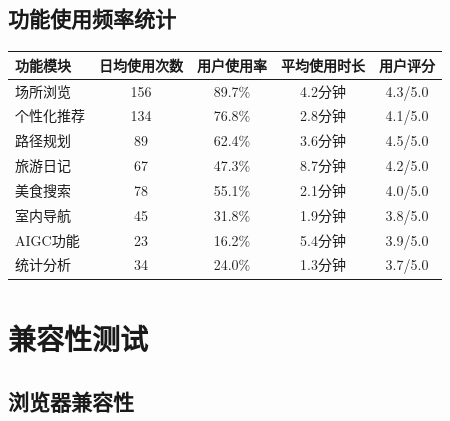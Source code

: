\documentclass[12pt,a4paper]{article}
\begin{document}
\subsection{功能使用频率统计}

\begin{table}[H]
\centering
\begin{tcolorbox}[
    colback=light,
    colframe=primary,
    title={\textbf{功能模块使用情况}},
    coltitle=white,
    colbacktitle=primary,
    fonttitle=\bfseries,
    rounded corners=5pt,
    width=0.95\textwidth
]
\begin{tabular}{lcccc}
\toprule
\rowcolor{primary!20}
\textbf{功能模块} & \textbf{日均使用次数} & \textbf{用户使用率} & \textbf{平均使用时长} & \textbf{用户评分} \\
\midrule
场所浏览 & 156 & 89.7\% & 4.2分钟 & 4.3/5.0 \\
\rowcolor{light}
个性化推荐 & 134 & 76.8\% & 2.8分钟 & 4.1/5.0 \\
路径规划 & 89 & 62.4\% & 3.6分钟 & 4.5/5.0 \\
\rowcolor{light}
旅游日记 & 67 & 47.3\% & 8.7分钟 & 4.2/5.0 \\
美食搜索 & 78 & 55.1\% & 2.1分钟 & 4.0/5.0 \\
\rowcolor{light}
室内导航 & 45 & 31.8\% & 1.9分钟 & 3.8/5.0 \\
AIGC功能 & 23 & 16.2\% & 5.4分钟 & 3.9/5.0 \\
\rowcolor{light}
统计分析 & 34 & 24.0\% & 1.3分钟 & 3.7/5.0 \\
\bottomrule
\end{tabular}
\end{tcolorbox}
\end{table}

\section{兼容性测试}

\subsection{浏览器兼容性}
\end{document}
